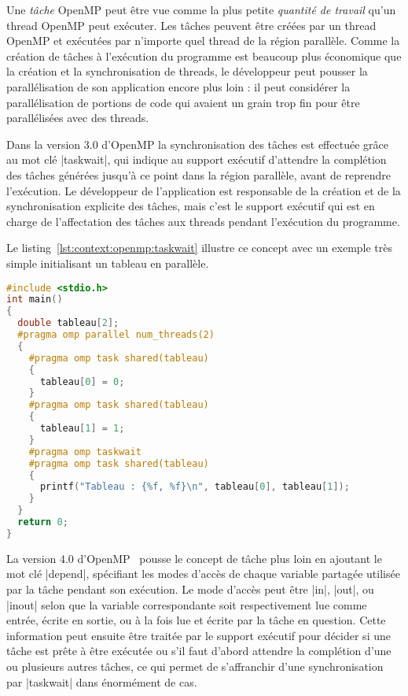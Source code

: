 Une \emph{tâche} OpenMP peut être vue comme la plus petite \emph{quantité de travail} qu'un thread OpenMP peut exécuter.
Les tâches peuvent être créées par un thread OpenMP et exécutées par n'importe quel thread de la région parallèle.
Comme la création de tâches à l'exécution du programme est beaucoup plus économique que la création et la synchronisation de threads, le développeur peut pousser la parallélisation de son application encore plus loin : il peut considérer la parallélisation de portions de code qui avaient un grain trop fin pour être parallélisées avec des threads.

Dans la version 3.0 d'OpenMP la synchronisation des tâches est effectuée grâce au mot clé |taskwait|, qui indique au support exécutif d'attendre la complétion des tâches générées jusqu'à ce point dans la région parallèle, avant de reprendre l'exécution.
Le développeur de l'application est responsable de la création et de la synchronisation explicite des tâches, mais c'est le support exécutif qui est en charge de l'affectation des tâches aux threads pendant l'exécution du programme.

Le listing~\ref{lst:context:openmp:taskwait} illustre ce concept avec un exemple très simple initialisant un tableau en parallèle.

\begin{lstlisting}[language=c++,caption=Création et synchronisation explicite de tâches,label=lst:context:openmp:taskwait]
#include <stdio.h>
int main()
{
  double tableau[2];
  #pragma omp parallel num_threads(2)
  {
    #pragma omp task shared(tableau)
    {
      tableau[0] = 0;
    }
    #pragma omp task shared(tableau)
    {
      tableau[1] = 1;
    }
    #pragma omp taskwait
    #pragma omp task shared(tableau)
    {
      printf("Tableau : {%f, %f}\n", tableau[0], tableau[1]);
    }
  }
  return 0;
}
\end{lstlisting}


La version 4.0 d'OpenMP~\cite{openmp40} pousse le concept de tâche plus loin en ajoutant le mot clé |depend|, spécifiant les modes d'accès de chaque variable partagée utilisée par la tâche pendant son exécution.
Le mode d'accès peut être |in|, |out|, ou |inout| selon que la variable correspondante soit respectivement lue comme entrée, écrite en sortie, ou à la fois lue et écrite par la tâche en question.
Cette information peut ensuite être traitée par le support exécutif pour décider si une tâche est prête à être exécutée ou s'il faut d'abord attendre la complétion d'une ou plusieurs autres tâches, ce qui permet de s'affranchir d'une synchronisation par |taskwait| dans énormément de cas.

